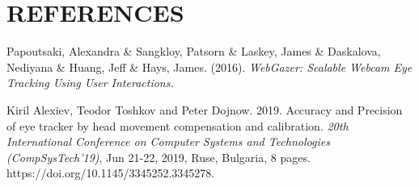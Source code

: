 \documentclass[a4paper,12pt,oneside]{article}
\begin{document}
\newpage

\section{REFERENCES}
\begin{thebibliography}{9}
    Papoutsaki, Alexandra \& Sangkloy, Patsorn \& Laskey, James \& Daskalova, Nediyana \& Huang, Jeff \& Hays, James. (2016). \emph{WebGazer: Scalable Webcam Eye Tracking Using User Interactions.}

    Kiril Alexiev, Teodor Toshkov and Peter Dojnow. 2019. Accuracy and Precision of eye tracker by head movement compensation and calibration. \emph{20th International Conference on Computer Systems and Technologies
(CompSysTech'19)}, Jun 21-22, 2019, Ruse, Bulgaria, 8 pages.
https://doi.org/10.1145/3345252.3345278.



\end{thebibliography}
\end{document}
